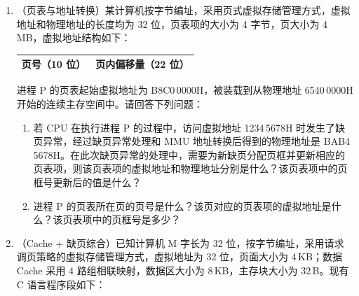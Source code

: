 \documentclass[12pt,a4paper]{ctexart}
\begin{document}
\begin{enumerate}[leftmargin=*,resume]
\begin{lstlisting}[language=C]
char *ptr;
void main() {
    int length;
    ptr = (char*) malloc(100);
    scanf("%s", ptr);
    length = strlen(ptr);
    printf("length=%d\n", length);
    free(ptr);
}
\end{lstlisting}

\begin{enumerate}[label=(\arabic*)]
\item 上述程序执行时，PCB 位于哪个区域？执行 \texttt{scanf()} 等待键盘输入时，该进程处于什么状态？
\item \texttt{main()} 函数的代码位于哪个区域？其直接调用的哪些函数的功能需要通过执行驱动程序实现？
\item 变量 \texttt{ptr} 被分配在哪个区域？若变量 \texttt{length} 没有被分配在寄存器中，则会被分配在哪个区域？\texttt{ptr} 指向的字符串位于哪个区域？
\end{enumerate}

\item （页表与地址转换）某计算机按字节编址，采用页式虚拟存储管理方式，虚拟地址和物理地址的长度均为 32 位，页表项的大小为 4 字节，页大小为 4\,MB，虚拟地址结构如下：

\begin{center}
\begin{tabular}{|c|c|}
\hline
页号（10 位） & 页内偏移量（22 位） \\
\hline
\end{tabular}
\end{center}

进程 P 的页表起始虚拟地址为 B8C0\,0000H，被装载到从物理地址 6540\,0000H 开始的连续主存空间中。请回答下列问题：

\begin{enumerate}[label=(\arabic*)]
\item 若 CPU 在执行进程 P 的过程中，访问虚拟地址 1234\,5678H 时发生了缺页异常，经过缺页异常处理和 MMU 地址转换后得到的物理地址是 BAB4\,5678H。在此次缺页异常的处理中，需要为新缺页分配页框并更新相应的页表项，则该页表项的虚拟地址和物理地址分别是什么？该页表项中的页框号更新后的值是什么？
\item 进程 P 的页表所在页的页号是什么？该页对应的页表项的虚拟地址是什么？该页表项中的页框号是多少？
\end{enumerate}

\item （Cache + 缺页综合）已知计算机 M 字长为 32 位，按字节编址，采用请求调页策略的虚拟存储管理方式，虚拟地址为 32 位，页面大小为 4\,KB；数据 Cache 采用 4 路组相联映射，数据区大小为 8\,KB，主存块大小为 32\,B。现有 C 语言程序段如下：


\end{enumerate}
\end{document}
